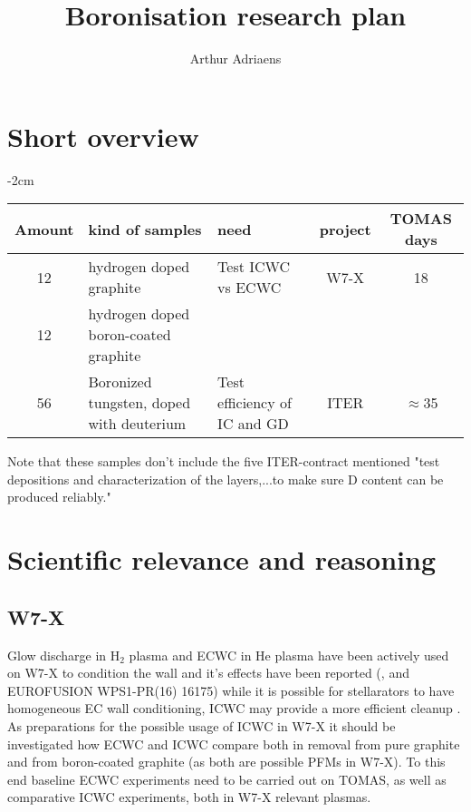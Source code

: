 \documentclass{article}
\title{Boronisation research plan}
\author{Arthur Adriaens}
\begin{document}
\maketitle

\section{Short overview}
\begin{center}
    \addtolength{\leftskip} {-2cm} %
    \addtolength{\rightskip}{-2cm}
    \begin{tabular}{||c p{4cm} p{4cm} c c||}
         \hline
         Amount & kind of samples & need & project & TOMAS days \\ [0.5ex]
         \hline\hline
         12 & hydrogen doped graphite & Test ICWC vs ECWC & W7-X & 18 \\
         12 & hydrogen doped boron-coated graphite & & & \\
         \hline
         56 & Boronized tungsten, doped with deuterium & Test efficiency of IC and GD & ITER & $\approx$35\\
         \hline
    \end{tabular}
\end{center}
Note that these samples don't include the five ITER-contract mentioned 
"test depositions and characterization of the layers,...to make sure D content can be produced reliably."
\section{Scientific relevance and reasoning}
\subsection*{W7-X}
Glow discharge in H$_2$ plasma and ECWC in He plasma have been actively used on
W7-X to condition the wall and it's effects have been reported
(\cite{Goriaev_2020},\cite{WAUTERS2018235} and EUROFUSION WPS1-PR(16) 16175)
while it is possible for stellarators to have homogeneous EC wall conditioning,
ICWC may provide a more efficient cleanup \cite{WEGAIC}. As preparations for
the possible usage of ICWC in W7-X it should be investigated how ECWC and ICWC
compare both in removal from pure graphite and from boron-coated graphite (as
both are possible PFMs in W7-X).  To this end baseline ECWC experiments need to
be carried out on TOMAS, as well as comparative ICWC experiments, both in W7-X relevant plasmas.
\end{document}
